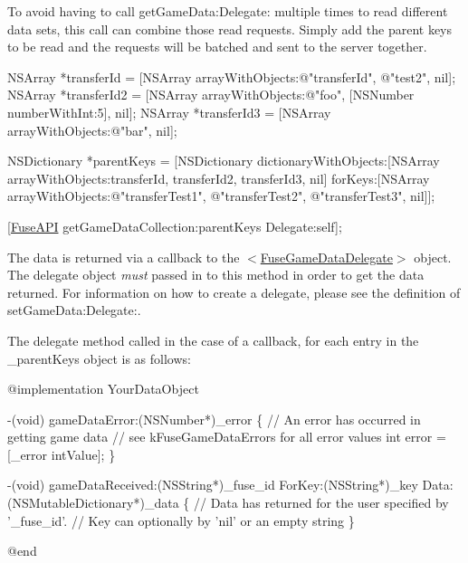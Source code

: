 To avoid having to call get\+Game\+Data\+:\+Delegate\+: multiple times to read different data sets, this call can combine those read requests. Simply add the parent keys to be read and the requests will be batched and sent to the server together.


\begin{DoxyCode}
NSArray *transferId = [NSArray arrayWithObjects:\textcolor{stringliteral}{@"transferId"}, \textcolor{stringliteral}{@"test2"}, nil];
NSArray *transferId2 = [NSArray arrayWithObjects:\textcolor{stringliteral}{@"foo"}, [NSNumber numberWithInt:5], nil];
NSArray *transferId3 = [NSArray arrayWithObjects:\textcolor{stringliteral}{@"bar"}, nil];

NSDictionary *parentKeys = [NSDictionary dictionaryWithObjects:[NSArray arrayWithObjects:transferId, 
      transferId2, transferId3, nil]
forKeys:[NSArray arrayWithObjects:\textcolor{stringliteral}{@"transferTest1"}, \textcolor{stringliteral}{@"transferTest2"}, \textcolor{stringliteral}{@"transferTest3"}, nil]];

[\hyperlink{interface_fuse_a_p_i}{FuseAPI} getGameDataCollection:parentKeys Delegate:\textcolor{keyword}{self}];
\end{DoxyCode}


The data is returned via a callback to the $<$\hyperlink{protocol_fuse_game_data_delegate-p}{Fuse\+Game\+Data\+Delegate}$>$ object. The delegate object {\itshape must} passed in to this method in order to get the data returned. For information on how to create a delegate, please see the definition of set\+Game\+Data\+:\+Delegate\+:.

The delegate method called in the case of a callback, for each entry in the \+\_\+parent\+Keys object is as follows\+:


\begin{DoxyCode}
\textcolor{keyword}{@implementation }YourDataObject

-(void) gameDataError:(NSNumber*)\_error
\{
   \textcolor{comment}{// An error has occurred in getting game data}
   \textcolor{comment}{// see kFuseGameDataErrors for all error values}
   \textcolor{keywordtype}{int} error = [\_error intValue];
\}

-(void) gameDataReceived:(NSString*)\_fuse\_id ForKey:(NSString*)\_key Data:(NSMutableDictionary*)\_data
\{
   \textcolor{comment}{// Data has returned for the user specified by '\_fuse\_id'.}
   \textcolor{comment}{// Key can optionally by 'nil' or an empty string}
\}

\textcolor{keyword}{@end}
\end{DoxyCode}



